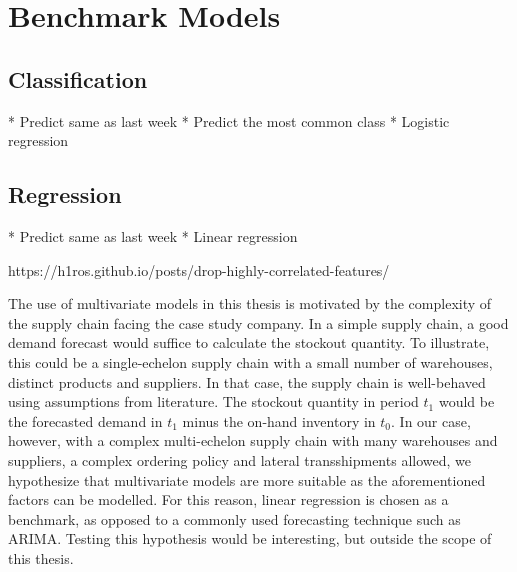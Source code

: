 \documentclass[../../main.tex]{subfiles}
\begin{document}

\section{Benchmark Models}

\subsection{Classification}
* Predict same as last week
* Predict the most common class
* Logistic regression

\subsection{Regression}
* Predict same as last week
* Linear regression

https://h1ros.github.io/posts/drop-highly-correlated-features/

The use of multivariate models in this thesis is motivated by the complexity of the supply chain facing the case study company. In a simple supply chain, a good demand forecast would suffice to calculate the stockout quantity. To illustrate, this could be a single-echelon supply chain with a small number of warehouses, distinct products and suppliers. In that case, the supply chain is well-behaved using assumptions from literature. The stockout quantity in period $t_1$ would be the forecasted demand in $t_1$ minus the on-hand inventory in $t_0$. In our case, however, with a complex multi-echelon supply chain with many warehouses and suppliers, a complex ordering policy and lateral transshipments allowed, we hypothesize that multivariate models are more suitable as the aforementioned factors can be modelled. For this reason, linear regression is chosen as a benchmark, as opposed to a commonly used forecasting technique such as ARIMA. Testing this hypothesis would be interesting, but outside the scope of this thesis.

\end{document}
